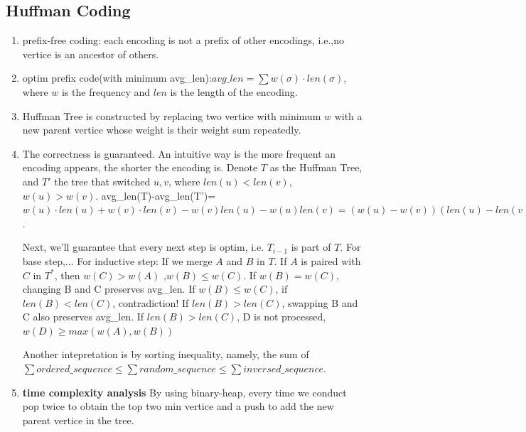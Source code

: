 \subsection{Huffman Coding}
\begin{enumerate}
    \item prefix-free coding: each encoding is not a prefix of other encodings, i.e.,no vertice is an ancestor of others.
    \item optim prefix code(with minimum avg\_len):$avg\_len=\sum w(\sigma)\cdot len(\sigma)$, where $w$ is the frequency and $len$ is the length of the encoding.
    \item Huffman Tree is constructed by replacing two vertice with minimum $w$ with a new parent vertice whose weight is their weight sum repeatedly.
    \item The correctness is guaranteed. An intuitive way is the more frequent an encoding appears, the shorter the encoding is.
    Denote $T$ as the Huffman Tree, and $T'$ the tree that switched $u,v$, where $len(u)<len(v)$, $w(u)>w(v)$.
    avg\_len(T)-avg\_len(T')=$w(u)\cdot len(u)+w(v)\cdot len(v)-w(v)len(u)-w(u)len(v)=(w(u)-w(v))(len(u)-len(v)) <0$.

    Next, we'll guarantee that every next step is optim, i.e. $T_{i-1}$ is part of $T$.
    For base step,...
    For inductive step: If we merge $A$ and $B$ in $T$. If $A$ is paired with $C$ in $T^*$, then $w(C)>w(A)$ ,$w(B)\leq w(C)$. If $w(B)=w(C)$, changing B and C preserves avg\_len.
    If $w(B)\leq w(C)$, if $len(B)<len(C)$, contradiction! If $len(B)>len(C)$, swapping B and C also preserves avg\_len. If $len(B)>len(C)$, D is not processed, $w(D)\geq max(w(A),w(B))$

    Another intepretation is by sorting inequality, namely, the sum of $\sum ordered\_sequence \leq \sum random\_sequence \leq \sum inversed\_sequence$.
    \item \textbf{time complexity analysis} By using binary-heap, every time we conduct pop twice to obtain the top two min vertice and a push to add the new parent vertice in the tree.
\end{enumerate}

